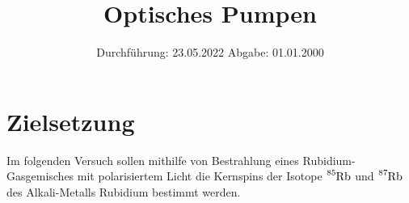 

\def\Rb#1{\ce{^{#1}Rb}}

\subject{V21}
\title{Optisches Pumpen}
\date{
    Durchführung: 23.05.2022
     \hspace{3em}
    Abgabe: 01.01.2000 %
}


\maketitle
\thispagestyle{empty}
\tableofcontents
\newpage

\section{Zielsetzung}

    Im folgenden Versuch sollen mithilfe von Bestrahlung eines Rubidium-Gasgemisches mit polarisiertem Licht die Kernspins der Isotope $\ce{^{85}Rb}$ und $\ce{^{87}Rb}$ des Alkali-Metalls Rubidium bestimmt werden.


\clearpage


\clearpage


\clearpage


\clearpage

\printbibliography


